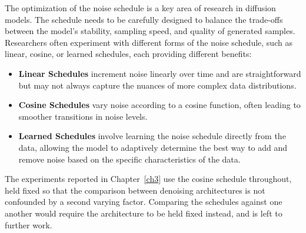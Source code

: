 The optimization of the noise schedule is a key area of research in diffusion models. The schedule
needs to be carefully designed to balance the trade-offs between the model's stability, sampling
speed, and quality of generated samples. Researchers often experiment with different forms of the
noise schedule, such as linear, cosine, or learned schedules, each providing different benefits:

\begin{itemize}
    \item \textbf{Linear Schedules} increment noise linearly over time and are straightforward but may not always capture the nuances of more complex data distributions.
    \item \textbf{Cosine Schedules} vary noise according to a cosine function, often leading to smoother transitions in noise levels.
    \item \textbf{Learned Schedules} involve learning the noise schedule directly from the data, allowing the model to adaptively determine the best way to add and remove noise based on the specific characteristics of the data.
\end{itemize}

The experiments reported in Chapter~\ref{ch3} use the cosine schedule throughout, held fixed so that
the comparison between denoising architectures is not confounded by a second varying factor.
Comparing the schedules against one another would require the architecture to be held fixed instead,
and is left to further work.

